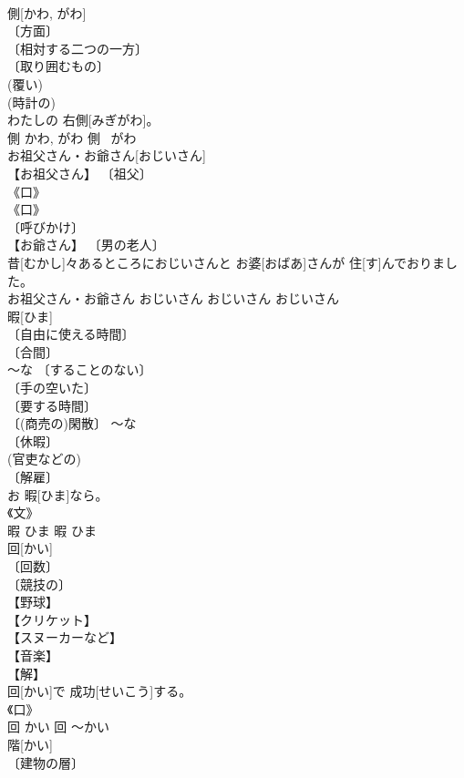 \documentclass[8pt]{extreport}
\begin{document}
\begin{CJK}{UTF8}{min}
\\	側[かわ, がわ]	
\\	〔方面〕 
\\	〔相対する二つの一方〕 
\\	〔取り囲むもの〕 
\\	(覆い) 
\\	(時計の) 
\\	わたしの 右側[みぎがわ]。	
\\	側	かわ, がわ	側	~がわ	
\\	お祖父さん・お爺さん[おじいさん]	
\\	【お祖父さん】 〔祖父〕 
\\	《口》 
\\	《口》 
\\	〔呼びかけ〕 
\\	【お爺さん】 〔男の老人〕 
\\	昔[むかし]々あるところにおじいさんと お婆[おばあ]さんが 住[す]んでおりました。	
\\	お祖父さん・お爺さん	おじいさん	おじいさん	おじいさん	
\\	暇[ひま]	
\\	〔自由に使える時間〕 
\\	〔合間〕 
\\	～な 〔することのない〕 
\\	〔手の空いた〕 
\\	〔要する時間〕 
\\	〔(商売の)閑散〕 ～な 
\\	〔休暇〕 
\\	(官吏などの) 
\\	〔解雇〕 
\\	お 暇[ひま]なら。	
\\	《文》 
\\	暇	ひま	暇	ひま	
\\	回[かい]	
\\	〔回数〕 
\\	〔競技の〕 
\\	【野球】 
\\	【クリケット】 
\\	【スヌーカーなど】 
\\	【音楽】 
\\	【解】 
\\	回[かい]で 成功[せいこう]する。	
\\	《口》 
\\	回	かい	回	〜かい	
\\	階[かい]	
\\	〔建物の層〕 

\end{CJK}
\end{document}
